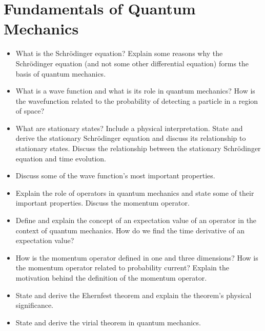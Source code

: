 



\tableofcontents

\section{Fundamentals of Quantum Mechanics}

\begin{itemize}

    \item What is the Schrödinger equation?
    Explain some reasons why the Schrödinger equation (and not some other differential equation) forms the basis of quantum mechanics.

    \item What is a wave function and what is its role in quantum mechanics? How is the wavefunction related to the probability of detecting a particle in a region of space? 

    \item What are stationary states? Include a  physical interpretation. State and derive the stationary Schrödinger equation and discuss its relationship to stationary states. Discuss the relationship between the stationary Schrödinger equation and time evolution.

    \item Discuss some of the wave function's most important properties.

    \item Explain the role of operators in quantum mechanics and state some of their important properties. Discuss the momentum operator.

    \item Define and explain the concept of an expectation value of an operator in the context of quantum mechanics. How do we find the time derivative of an expectation value? 

    \item How is the momentum operator defined in one and three dimensions? How is the momentum operator related to probability current? Explain the motivation behind the definition of the momentum operator.

    \item State and derive the Ehernfest theorem and explain the theorem's physical significance.

    \item State and derive the virial theorem in quantum mechanics.

\end{itemize}

